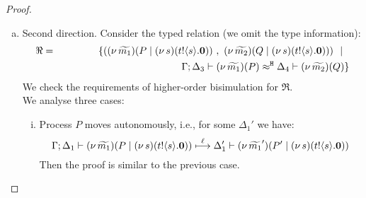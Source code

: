 \begin{proof}
\begin{enumerate}[$-$]
\begin{enumerate}[a)]
		\item	Second direction. Consider the typed relation (we omit the type information):
				\begin{eqnarray*}
					\Re &=& \set{	(\newsp{\widetilde{m_1}}{P \Par \newsp{s}{\bout{t}{s} \inact}}\ , \ 
									\newsp{\widetilde{m_2}}{Q \Par \newsp{s}{\bout{t}{s} \inact}}) \setbar\\
					&&
									\qquad \qquad \qquad \qquad \qquad \qquad \horel{\Gamma}{\Delta_3}{\newsp{\widetilde{m_1}}{P  } }
									{\hwb}
									{\Delta_4}{\newsp{\widetilde{m_2}}{Q  } }
					}	
				\end{eqnarray*}
				We check the requirements of higher-order bisimulation
				for $\Re$. \\
				We analyse three cases:
				\begin{enumerate}[i)]
					\item Process $P$ moves autonomously, i.e., for some $\Delta_1'$ we have:
							\[
								\Gamma; \Delta_1 \vdash (\nu\, \widetilde{m_1})(P \;|\; (\nu\, s)(t ! \langle s \rangle . \mathbf{0})  )  \stackrel{\ell}{\longmapsto} \Delta_1' \vdash (\nu\, \widetilde{m_1}')(P' \;|\; (\nu\, s)(t ! \langle s \rangle . \mathbf{0}))
							\]
							Then the proof is similar to the previous case.


\end{enumerate}
\end{enumerate}
\end{enumerate}
\end{proof}
